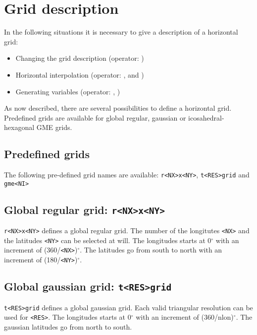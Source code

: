 \section{Grid description}

In the following situations it is necessary to give a description of a horizontal grid:

\begin{itemize}
\item Changing the grid description (operator: )
\item Horizontal interpolation (operator: ,  and )
\item Generating variables (operator: , )
\end{itemize}

As now described, there are several possibilities to define a horizontal grid.
Predefined grids are available for global regular, gaussian or icosahedral-hexagonal GME grids.


\subsection{Predefined grids}

The following pre-defined grid names are available: 
{\tt r<NX>x<NY>}, {\tt t<RES>grid} and {\tt gme<NI>}

\subsection*{Global regular grid: {\tt r<NX>x<NY>}}
    {\tt r<NX>x<NY>} defines a global regular grid.
    The number of the longitutes {\tt <NX>} and the latitudes {\tt <NY>}
    can be selected at will.
    The longitudes starts at 0$^\circ$ with an increment of (360/{\tt <NX>})$^\circ$.
    The latitudes go from south to north with an increment of (180/{\tt <NY>})$^\circ$.

\subsection*{Global gaussian grid: {\tt t<RES>grid}}
    {\tt t<RES>grid} defines a global gaussian grid.
    Each valid triangular resolution can be used for {\tt <RES>}.
    The longitudes starts at 0$^\circ$ with an increment of (360/nlon)$^\circ$.
    The gaussian latitudes go from north to south.

